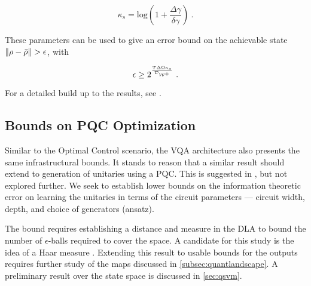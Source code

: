 \begin{equation}
    \kappa_s = \text{log}(1+\frac{\Delta\gamma}{\delta\gamma})~.
\end{equation}

These parameters can be used to give an error bound on the achievable state
\(\norm{\rho - \bar{\rho}} > \epsilon\), with

\begin{equation}
    \epsilon \geq 2^{\frac{T\Delta\Omega\kappa_s}{\mathcal{D}_{\mathcal{W^+}}}}~.
\end{equation}

For a detailed build up to the results, see \cite{lloyd2014information}.

\subsection{Bounds on PQC Optimization}

Similar to the Optimal Control scenario, the VQA architecture also presents the
same infrastructural bounds. It stands to reason that a similar result should
extend to generation of unitaries using a PQC. This is suggested in
\cite{lloyd2014information}, but not explored further. We seek to establish
lower bounds on the information theoretic error on learning the unitaries in
terms of the circuit parameters --- circuit width, depth, and choice of
generators (ansatz).

The bound requires establishing a distance and measure in the DLA to bound the
number of \(\epsilon\)-balls required to cover the space. A candidate for this
study is the idea of a Haar measure \cite{van1995haar}. Extending this result to
usable bounds for the outputs requires further study of the maps discussed in
\autoref{subsec:quantlandscape}. A preliminary result over the state space is
discussed in \autoref{sec:qsvm}.
